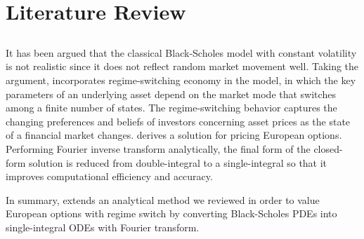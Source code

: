 \documentclass[11pt,letter]{article}
\theoremstyle{definition}
\theoremstyle{remark}
\numberwithin{equation}{section}
\begin{document}
\section{Literature Review}
\subsection{\cite{zhu2012new}}
It has been argued that the classical Black-Scholes model with constant volatility is not realistic since it does not reflect random market movement well. Taking the argument, \cite{zhu2012new} incorporates regime-switching economy in the model, in which the key parameters of an underlying asset depend on the market mode that switches among a finite number of states. The regime-switching behavior captures the changing preferences and beliefs of investors concerning asset prices as the state of a financial market changes. \cite{zhu2012new} derives a solution for pricing European options. Performing Fourier inverse transform analytically, the final form of the closed-form solution is reduced from double-integral to a single-integral so that it improves computational efficiency and accuracy.

In summary, \cite{zhu2012new} extends an analytical method we reviewed in order to value European options with regime switch by converting Black-Scholes PDEs into single-integral ODEs with Fourier transform.
\end{document}
